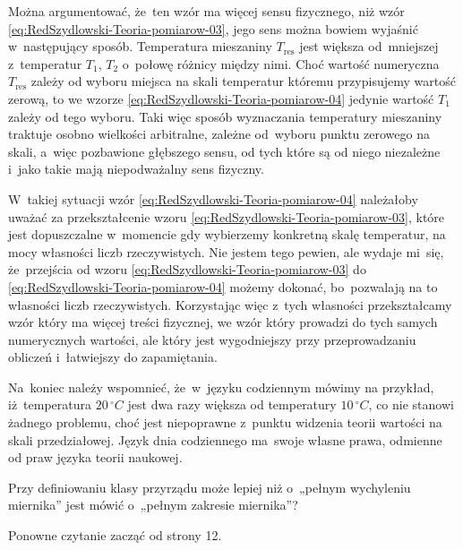 \documentclass[a4paper,11pt]{article}
\begin{document}
Można argumentować, że~ten wzór ma więcej sensu fizycznego, niż wzór
\eqref{eq:RedSzydlowski-Teoria-pomiarow-03}, jego sens można bowiem wyjaśnić
w~następujący sposób. Temperatura mieszaniny $T_{ \textrm{res} }$ jest większa
od~mniejszej z~temperatur $T_{ 1 }$, $T_{ 2 }$ o~połowę różnicy między nimi.
Choć wartość numeryczna $T_{ \textrm{res} }$ zależy od wyboru miejsca na skali
temperatur któremu przypisujemy wartość zerową, to we wzorze
\eqref{eq:RedSzydlowski-Teoria-pomiarow-04} jedynie wartość $T_{ 1 }$ zależy
od tego wyboru. Taki więc sposób wyznaczania temperatury mieszaniny traktuje
osobno wielkości arbitralne, zależne od~wyboru punktu zerowego na skali,
a~więc pozbawione głębszego sensu, od tych które są od niego
niezależne i~jako takie mają niepodważalny sens fizyczny.

W~takiej sytuacji wzór \eqref{eq:RedSzydlowski-Teoria-pomiarow-04}
należałoby uważać za przekształcenie wzoru
\eqref{eq:RedSzydlowski-Teoria-pomiarow-03}, które jest dopuszczalne
w~momencie gdy wybierzemy konkretną skalę temperatur, na mocy własności
liczb rzeczywistych. Nie jestem tego pewien, ale wydaje mi~się, że~przejścia
od wzoru \eqref{eq:RedSzydlowski-Teoria-pomiarow-03} do
\eqref{eq:RedSzydlowski-Teoria-pomiarow-04} możemy dokonać, bo~pozwalają na
to własności liczb rzeczywistych. Korzystając więc z~tych własności
przekształcamy wzór który ma więcej treści fizycznej, we wzór który prowadzi
do tych samych numerycznych wartości, ale który jest wygodniejszy przy
przeprowadzaniu obliczeń i~łatwiejszy do zapamiętania.

Na~koniec należy wspomnieć, że~w~języku codziennym mówimy na przykład,
iż~temperatura $20 \, {}^{ \circ }\si{C}$ jest dwa razy większa od temperatury
$10 \, {}^{ \circ }\si{C}$, co nie stanowi żadnego problemu, choć jest
niepoprawne z~punktu widzenia teorii wartości na skali przedziałowej. Język
dnia codziennego ma~swoje własne prawa, odmienne od praw języka teorii
naukowej.

\vspace{\VerSpaceFour}





\noindent
{} Przy definiowaniu klasy przyrządu może lepiej niż o~„pełnym
wychyleniu miernika” jest mówić o~„pełnym zakresie miernika”?

\vspace{\VerSpaceFour}





{\Large Ponowne czytanie zacząć od strony 12.}
\end{document}
